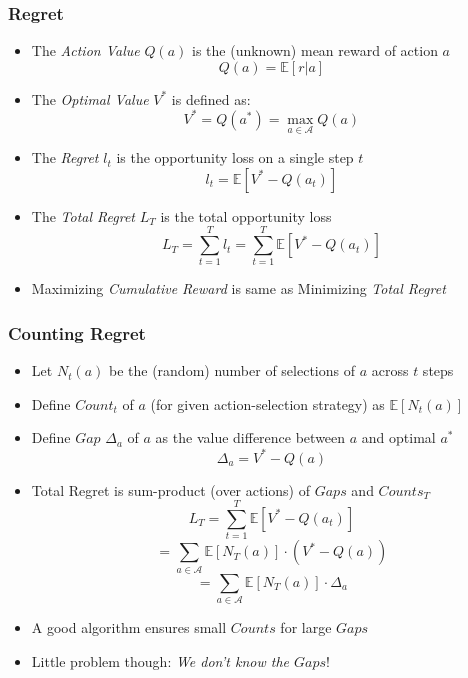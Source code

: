 \documentclass[handout]{beamer}
\begin{document}
\begin{frame}
\frametitle{Regret}
\pause
\begin{itemize}[<+->]
\item The {\em Action Value} $Q(a)$ is the (unknown) mean reward of action $a$
$$Q(a) = \mathbb{E}[r|a]$$
\item The {\em Optimal Value} $V^*$ is defined as:
$$V^* = Q(a^*) = \max_{a\in\mathcal{A}} Q(a)$$
\item The {\em Regret} $l_t$ is the opportunity loss on a single step $t$
$$l_t = \mathbb{E}[V^* - Q(a_t)]$$
\item The {\em Total Regret} $L_T$ is the total opportunity loss
$$L_T = \sum_{t=1}^T l_t = \sum_{t=1}^T \mathbb{E}[V^* - Q(a_t)]$$
\item Maximizing {\em Cumulative Reward} is same as Minimizing {\em Total Regret}
\end{itemize}
\end{frame}

\begin{frame}
\frametitle{Counting Regret}
\pause
\begin{itemize}[<+->]
\item Let $N_t(a)$ be the (random) number of selections of $a$ across $t$ steps
\item Define $Count_t$ of $a$ (for given action-selection strategy) as $\mathbb{E}[N_t(a)]$
\item Define $Gap$ $\Delta_a$ of $a$ as the value difference between $a$ and optimal $a^*$
$$\Delta_a = V^* - Q(a) $$
\item Total Regret is sum-product (over actions) of $Gaps$ and $Counts_T$
$$L_T = \sum_{t=1}^T \mathbb{E}[V^* - Q(a_t)]$$
$$ = \sum_{a\in\mathcal{A}} \mathbb{E}[N_T(a)] \cdot (V^* - Q(a))$$
$$ = \sum_{a\in\mathcal{A}} \mathbb{E}[N_T(a)] \cdot \Delta_a$$
\item A good algorithm ensures small $Counts$ for large $Gaps$
\item Little problem though: {\em We don't know the $Gaps$}!
\end{itemize}
\end{frame}
\end{document}
